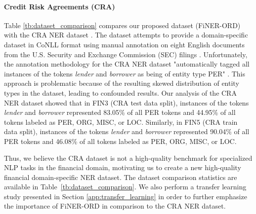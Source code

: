 \documentclass[11pt]{article}
\begin{document}

\paragraph{Credit Risk Agreements (CRA)}
Table \ref{tb:dataset_comparison} compares our proposed dataset (FiNER-ORD) with the CRA NER dataset \citep{alvarado2015domain}. The dataset attempts to provide a domain-specific dataset in CoNLL format using manual annotation on eight English documents from the U.S. Security and Exchange Commission (SEC) filings \citep{bird2009nltk}. Unfortunately, the annotation methodology for the CRA NER dataset "automatically tagged all instances of the tokens \textit{lender} and \textit{borrower} as being of entity type PER" \citep{alvarado2015domain}. This approach is problematic because of the resulting skewed distribution of entity types in the dataset, leading to confounded results. Our analysis of the CRA NER dataset showed that in FIN3 (CRA test data split), instances of the tokens \textit{lender} and \textit{borrower} represented 83.05\% of all PER tokens and 44.95\% of all tokens labeled as PER, ORG, MISC, or LOC. Similarly, in FIN5 (CRA train data split), instances of the tokens \textit{lender} and \textit{borrower} represented 90.04\% of all PER tokens and 46.08\% of all tokens labeled as PER, ORG, MISC, or LOC.

Thus, we believe the CRA dataset is not a high-quality benchmark for specialized NLP tasks in the financial domain, motivating us to create a new high-quality financial domain-specific NER dataset. The dataset comparison statistics are available in Table~\ref{tb:dataset_comparison}. We also perform a transfer learning study presented in Section \ref{app:transfer_learning} in order to further emphasize the importance of FiNER-ORD in comparison to the CRA NER dataset.
\end{document}
